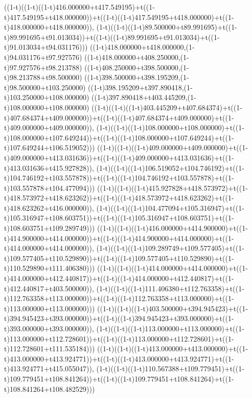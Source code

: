 ((1-t)((1-t)((1-t)416.000000+t417.549195)+t((1-t)417.549195+t418.000000))+t((1-t)((1-t)417.549195+t418.000000)+t((1-t)418.000000+t418.000000)),                                     (1-t)((1-t)((1-t)89.500000+t89.991695)+t((1-t)89.991695+t91.013034))+t((1-t)((1-t)89.991695+t91.013034)+t((1-t)91.013034+t94.031176)))
((1-t)418.000000+t418.000000,(1-t)94.031176+t97.927576)
((1-t)418.000000+t408.250000,(1-t)97.927576+t98.213788)
((1-t)408.250000+t398.500000,(1-t)98.213788+t98.500000)
((1-t)398.500000+t398.195209,(1-t)98.500000+t103.250000)
((1-t)398.195209+t397.890418,(1-t)103.250000+t108.000000)
((1-t)397.890418+t403.445209,(1-t)108.000000+t108.000000)
((1-t)((1-t)((1-t)403.445209+t407.684374)+t((1-t)407.684374+t409.000000))+t((1-t)((1-t)407.684374+t409.000000)+t((1-t)409.000000+t409.000000)),                                     (1-t)((1-t)((1-t)108.000000+t108.000000)+t((1-t)108.000000+t107.649244))+t((1-t)((1-t)108.000000+t107.649244)+t((1-t)107.649244+t106.519052)))
((1-t)((1-t)((1-t)409.000000+t409.000000)+t((1-t)409.000000+t413.031636))+t((1-t)((1-t)409.000000+t413.031636)+t((1-t)413.031636+t415.927828)),                                     (1-t)((1-t)((1-t)106.519052+t104.746192)+t((1-t)104.746192+t103.557878))+t((1-t)((1-t)104.746192+t103.557878)+t((1-t)103.557878+t104.477094)))
((1-t)((1-t)((1-t)415.927828+t418.573972)+t((1-t)418.573972+t418.623262))+t((1-t)((1-t)418.573972+t418.623262)+t((1-t)418.623262+t416.000000)),                                     (1-t)((1-t)((1-t)104.477094+t105.316947)+t((1-t)105.316947+t108.603751))+t((1-t)((1-t)105.316947+t108.603751)+t((1-t)108.603751+t109.289749)))
((1-t)((1-t)((1-t)416.000000+t414.900000)+t((1-t)414.900000+t414.000000))+t((1-t)((1-t)414.900000+t414.000000)+t((1-t)414.000000+t414.000000)),                                     (1-t)((1-t)((1-t)109.289749+t109.577405)+t((1-t)109.577405+t110.529890))+t((1-t)((1-t)109.577405+t110.529890)+t((1-t)110.529890+t111.406380)))
((1-t)((1-t)((1-t)414.000000+t414.000000)+t((1-t)414.000000+t412.440817))+t((1-t)((1-t)414.000000+t412.440817)+t((1-t)412.440817+t403.500000)),                                     (1-t)((1-t)((1-t)111.406380+t112.763358)+t((1-t)112.763358+t113.000000))+t((1-t)((1-t)112.763358+t113.000000)+t((1-t)113.000000+t113.000000)))
((1-t)((1-t)((1-t)403.500000+t394.945423)+t((1-t)394.945423+t393.000000))+t((1-t)((1-t)394.945423+t393.000000)+t((1-t)393.000000+t393.000000)),                                     (1-t)((1-t)((1-t)113.000000+t113.000000)+t((1-t)113.000000+t112.728601))+t((1-t)((1-t)113.000000+t112.728601)+t((1-t)112.728601+t111.535184)))
((1-t)((1-t)((1-t)413.000000+t413.000000)+t((1-t)413.000000+t413.924771))+t((1-t)((1-t)413.000000+t413.924771)+t((1-t)413.924771+t415.055047)),                                     (1-t)((1-t)((1-t)110.567388+t109.779451)+t((1-t)109.779451+t108.841264))+t((1-t)((1-t)109.779451+t108.841264)+t((1-t)108.841264+t108.482529)))

